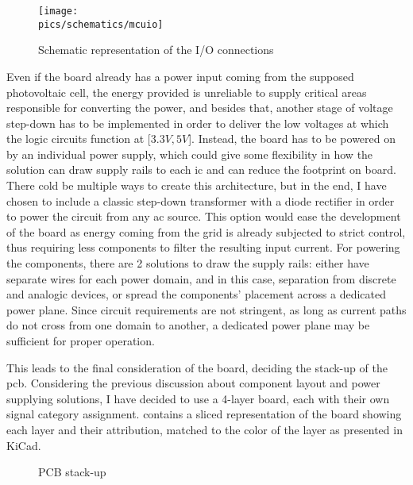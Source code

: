 \begin{figure}[!ht]
    \begin{center}\texttt{[image: \\pics/schematics/mcuio]}\end{center}
    \caption{Schematic representation of the I/O connections}
    \label{fig:mcuio}
\end{figure}

Even if the board already has a power input coming from the supposed photovoltaic cell, the energy provided is unreliable to supply critical areas responsible for converting the power, and besides that, another stage of voltage step-down has to be implemented in order to deliver the low voltages at which the logic circuits function at [$3.3V, 5V$].
Instead, the board has to be powered on by an individual power supply, which could give some flexibility in how the solution can draw supply rails to each \gls{ic} and can reduce the footprint on board.
There cold be multiple ways to create this architecture, but in the end, I have chosen to include a classic step-down transformer with a diode rectifier in order to power the circuit from any \gls{ac} source.
This option would ease the development of the board as energy coming from the grid is already subjected to strict control, thus requiring less components to filter the resulting input current.
For powering the components, there are 2 solutions to draw the supply rails: either have separate wires for each power domain, and in this case, separation from discrete and analogic devices, or spread the components' placement across a dedicated power plane\cite{zumbahlen2007basic}.
Since circuit requirements are not stringent, as long as current paths do not cross from one domain to another, a dedicated power plane may be sufficient for proper operation.

This leads to the final consideration of the board, deciding the stack-up of the \gls{pcb}.
Considering the previous discussion about component layout and power supplying solutions, I have decided to use a 4-layer board, each with their own signal category assignment.
 contains a sliced representation of the board showing each layer and their attribution, matched to the color of the layer as presented in KiCad.

\begin{figure}[!ht]
    \begin{center}
        \caption{PCB stack-up}
        \label{fig:stack}
    \end{center}
\end{figure}

